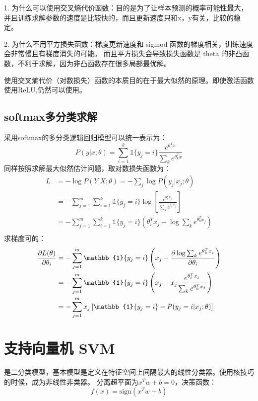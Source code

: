 {}

1. 为什么可以使用交叉熵代价函数：目的是为了让样本预测的概率可能性最大，
并且训练求解参数的速度是比较快的，而且更新速度只和x，y有关，比较的稳定。

2. 为什么不用平方损失函数：梯度更新速度和 sigmod 函数的梯度相关，训练速度会非常慢且有梯度消失的可能。
而且平方损失会导致损失函数是 theta 的非凸函数，不利于求解，因为非凸函数存在很多局部最优解。

使用交叉熵代价（对数损失）函数的本质目的在于最大似然的原理。即使激活函数使用ReLU,仍然可以使用。

\subsection{softmax多分类求解}
采用softmax的多分类逻辑回归模型可以统一表示为：
\begin{equation*}
    P(y|x;\theta) = \sum_{i=1}^k \mathbb{1}\{ y_j=i \} \frac{e^{\theta_i^T x}}{\sum_k e^{\theta_k^T x}}
\end{equation*}
同样按照求解最大似然估计问题，取对数损失函数为：
\begin{align*}
    L &= -\log P(Y|X;\theta) = -\sum_j \log P(y_j|x_j;\theta) \\
    &= -\sum_{j=1}^{m} \sum_{i=1}^k \mathbb{1}\{ y_j=i \} \log \left[\frac{e^{\theta_i^T x_j}}{\sum_k e^{\theta_k^T x_j}} \right] \\
    &= -\sum_{j=1}^{m} \sum_{i=1}^k \mathbb{1}\{ y_j=i \} \left( \theta_i^T x_j - \log \sum_k e^{\theta_k^T x_j} \right)\\
\end{align*}
求梯度可的：
\begin{align*}
    \Q{L(\theta)}{\theta_i} &= -\sum_{j=1}^{m} \mathbb{1}\{ y_j=i \} \left(x_j - \Q{\log \sum_k e^{\theta_k^T x_j}}{\theta_i} \right)\\
    &= -\sum_{j=1}^{m} \mathbb{1}\{ y_j=i \} \left(x_j - x_j \frac{e^{\theta_i^T x_j}}{\sum_k e^{\theta_k^T x_j}} \right)\\
    &= -\sum_{j=1}^{m} x_j \left[ \mathbb{1}\{ y_j=i \} - P(y_j=i|x_j;\theta) \right]
\end{align*}


\section{支持向量机 SVM}
是二分类模型，基本模型是定义在特征空间上间隔最大的线性分类器。使用核技巧的时候，成为非线性非类器。
分离超平面为$x^T w + b = 0$，决策函数：
\begin{equation*}
    f(x) = \text{sign}(x^T w + b)
\end{equation*}

